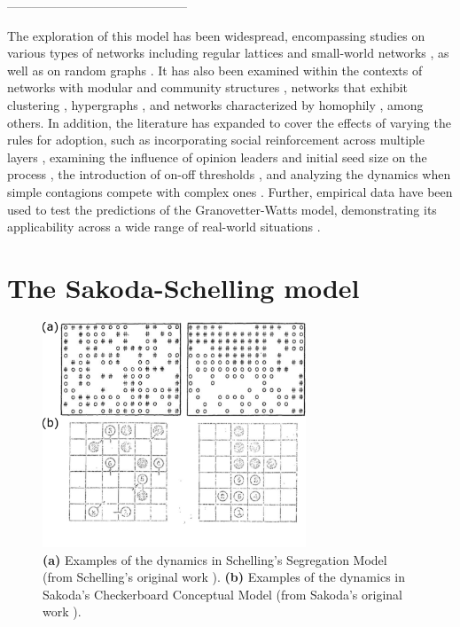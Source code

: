--------------------------------------------

The exploration of this model has been widespread, encompassing studies on various types of networks including regular lattices and small-world networks \cite{centola-2007}, as well as on random graphs \cite{gleeson-2007}. It has also been examined within the contexts of networks with modular and community structures \cite{gleeson-2008}, networks that exhibit clustering \cite{hackett-2011,hackett-2013}, hypergraphs \cite{de-arruda-2020}, and networks characterized by homophily \cite{diaz-diaz-2022}, among others. In addition, the literature has expanded to cover the effects of varying the rules for adoption, such as incorporating social reinforcement across multiple layers \cite{chen-2018}, examining the influence of opinion leaders and initial seed size on the process \cite{liu-2018, singh-2013}, the introduction of on-off thresholds \cite{dodds-2013}, and analyzing the dynamics when simple contagions compete with complex ones \cite{czaplicka-2016, min-2018, diaz-diaz-2022}. Further, empirical data have been used to test the predictions of the Granovetter-Watts model, demonstrating its applicability across a wide range of real-world situations \cite{centola-2010, karimi-2013, karsai-2014, rosenthal-2015, karsai-2016, mnsted-2017, unicomb-2018, guilbeault-2021}.

\section{\label{sec:The Sakoda-Schelling model} The Sakoda-Schelling model}

\begin{figure}
    \centering
    \captionsetup{font=sf}
    \includegraphics[width=0.7\textwidth]{Figs/Introduction/schelling_diagrams.png}
    \caption[Schelling and Sakoda checkerboard examples]{\textbf{(a)} Examples of the dynamics in Schelling's Segregation Model (from Schelling's original work \cite{Schelling}). \textbf{(b)} Examples of the dynamics in Sakoda’s Checkerboard Conceptual Model (from Sakoda's original work \cite{sakoda1949minidoka}).}
    \label{fig:Schelling_fig}
\end{figure}


